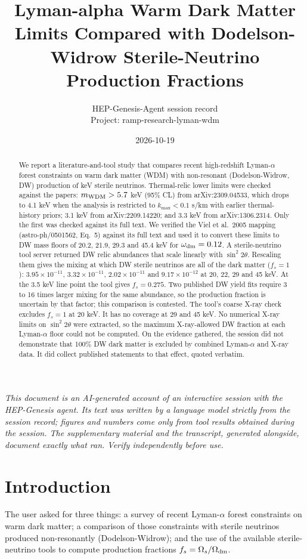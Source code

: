 \documentclass[11pt,a4paper]{article}
\title{Lyman-alpha Warm Dark Matter Limits Compared with Dodelson-Widrow Sterile-Neutrino Production Fractions}
\author{HEP-Genesis-Agent session record \\ \small Project: ramp-research-lyman-wdm}
\date{2026-10-19}
\begin{document}
\maketitle
\noindent\textit{\small This document is an AI-generated account of an interactive session with the HEP-Genesis agent. Its text was written by a language model strictly from the session record; figures and numbers come only from tool results obtained during the session. The supplementary material and the transcript, generated alongside, document exactly what ran. Verify independently before use.}
\vspace{1em}

\begin{abstract}
We report a literature-and-tool study that compares recent high-redshift Lyman-$\alpha$ forest constraints on warm dark matter (WDM) with non-resonant (Dodelson-Widrow, DW) production of keV sterile neutrinos. Thermal-relic lower limits were checked against the papers: $m_{\rm WDM}>5.7$ keV (95\% CL) from arXiv:2309.04533, which drops to 4.1 keV when the analysis is restricted to $k_{\max}<0.1$ s/km with earlier thermal-history priors; 3.1 keV from arXiv:2209.14220; and 3.3 keV from arXiv:1306.2314. Only the first was checked against its full text. We verified the Viel et al.\ 2005 mapping (astro-ph/0501562, Eq.~5) against its full text and used it to convert these limits to DW mass floors of 20.2, 21.9, 29.3 and 45.4 keV for $\omega_{\rm dm}=0.12$. A sterile-neutrino tool server returned DW relic abundances that scale linearly with $\sin^2 2\theta$. Rescaling them gives the mixing at which DW sterile neutrinos are all of the dark matter ($f_s=1$): $3.95\times10^{-11}$, $3.32\times10^{-11}$, $2.02\times10^{-11}$ and $9.17\times10^{-12}$ at 20, 22, 29 and 45 keV. At the 3.5 keV line point the tool gives $f_s=0.275$. Two published DW yield fits require 3 to 16 times larger mixing for the same abundance, so the production fraction is uncertain by that factor; this comparison is contested. The tool's coarse X-ray check excludes $f_s=1$ at 20 keV. It has no coverage at 29 and 45 keV. No numerical X-ray limits on $\sin^2 2\theta$ were extracted, so the maximum X-ray-allowed DW fraction at each Lyman-$\alpha$ floor could not be computed. On the evidence gathered, the session did not demonstrate that 100\% DW dark matter is excluded by combined Lyman-$\alpha$ and X-ray data. It did collect published statements to that effect, quoted verbatim.
\end{abstract}

\section{Introduction}
The user asked for three things: a survey of recent Lyman-$\alpha$ forest constraints on warm dark matter; a comparison of those constraints with sterile neutrinos produced non-resonantly (Dodelson-Widrow); and the use of the available sterile-neutrino tools to compute production fractions $f_s=\Omega_s/\Omega_{\rm dm}$.
\end{document}
